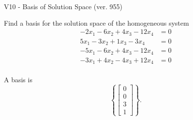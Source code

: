 \begin{exercise}
  \begin{exerciseTitle}V10 - Basis of Solution Space (ver. 955)\end{exerciseTitle}
  \begin{exerciseStatement}
    Find a basis for the solution space of the homogeneous system 
\begin{align*}
 -2 x_ 1 -6 x_ 2 + 4 x_ 3 -12 x_ 4 &= 0  \\ 
  5 x_ 1 -3 x_ 2 + 1 x_ 3 -3 x_ 4 &= 0  \\ 
  -5 x_ 1 -6 x_ 2 + 4 x_ 3 -12 x_ 4 &= 0  \\ 
  -3 x_ 1 + 4 x_ 2 -4 x_ 3 + 12 x_ 4 &= 0  \\ 
 \end{align*}


 
  \end{exerciseStatement}

  \begin{exerciseAnswer}
   A basis is   
\[\left\{\left[\begin{array}{c}
0 \\
0 \\
3 \\
1
\end{array}\right]\right\}.\]

  


  \end{exerciseAnswer}
\end{exercise}